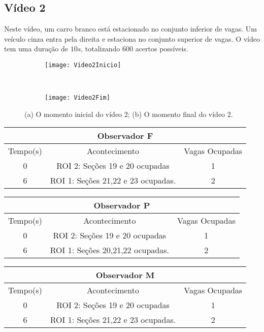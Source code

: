 \subsection{Vídeo 2}

Neste vídeo, um carro branco está estacionado no conjunto inferior de vagas. Um veículo cinza entra pela direita e estaciona no conjunto superior de vagas. O vídeo tem uma duração de $10s$, totalizando $600$ acertos possíveis.

\begin{figure}[!h]
\centering
\begin{subfigure}{.5\textwidth}
\centering
\texttt{[image: Video2Inicio]}
\caption{}
\end{subfigure}\
\begin{subfigure}{.5\textwidth}
\centering
\texttt{[image: Video2Fim]}
\caption{}
\end{subfigure}
\centering
\caption{(a) O momento inicial do vídeo 2; (b) O momento final do vídeo 2.}%
\label{}%
\end{figure}


\begin{center}
\begin{tabular}{|c||c||c|}
\hline
\multicolumn{3}{|c|}{Observador F}  \\ \hline \hline
Tempo(s) & Acontecimento & Vagas Ocupadas\\ \hline
0 & ROI 2: Seções 19 e 20 ocupadas & 1 \\ \hline
6 & ROI 1: Seções 21,22 e 23 ocupadas. & 2 \\
\hline
\end{tabular}
\end{center}

\begin{center}
\begin{tabular}{|c||c||c|}
\hline
\multicolumn{3}{|c|}{Observador P}  \\ \hline \hline
Tempo(s) & Acontecimento & Vagas Ocupadas\\ \hline
0 & ROI 2: Seções 19 e 20 ocupadas  & 1\\ \hline
6 & ROI 1: Seções 20,21,22 ocupadas. & 2 \\
\hline
\end{tabular}
\end{center}

\begin{center}
\begin{tabular}{|c||c||c|}
\hline
\multicolumn{3}{|c|}{Observador M}  \\ \hline \hline
Tempo(s) & Acontecimento & Vagas Ocupadas\\ \hline
0 & ROI 2: Seções 19 e 20 ocupadas & 1\\ \hline
6 & ROI 1: Seções 21,22 e 23 ocupadas. & 2\\
\hline
\end{tabular}
\end{center}

